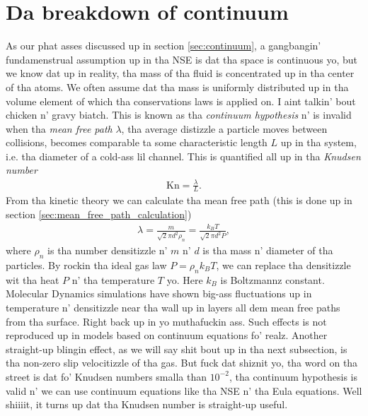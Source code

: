 \section{Da breakdown of continuum}
\label{sec:continuum_breakdown}
As our phat asses discussed up in section \ref{sec:continuum}, a gangbangin' fundamenstrual assumption up in tha NSE is dat tha space is continuous yo, but we know dat up in reality, tha mass of tha fluid is concentrated up in tha center of tha atoms. We often assume dat tha mass is uniformly distributed up in tha volume element of which tha conservations laws is applied on. I aint talkin' bout chicken n' gravy biatch. This is known as tha \textit{continuum hypothesis} n' is invalid when tha \textit{mean free path} $\lambda$, tha average distizzle a particle moves between collisions, becomes comparable ta some characteristic length $L$ up in tha system, i.e. tha diameter of a cold-ass lil channel\cite{karniadakis2005microflows}. This is quantified all up in tha \textit{Knudsen number}
\begin{align}
	\text{Kn} = \frac{\lambda}{L}.
\end{align}
From tha kinetic theory we can calculate tha mean free path (this is done up in section \ref{sec:mean_free_path_calculation})
\begin{align}
	\lambda = \frac{m}{\sqrt 2 \pi d^2 \rho_n} = \frac{k_B T}{\sqrt 2 \pi d^2 P},
\end{align}
where $\rho_n$ is tha number densitizzle n' $m$ n' $d$ is tha mass n' diameter of tha particles. By rockin tha ideal gas law $P = \rho_n k_BT$, we can replace tha densitizzle wit tha heat $P$ n' tha temperature $T$ yo. Here $k_B$ is Boltzmannz constant. Molecular Dynamics simulations have shown big-ass fluctuations up in temperature n' densitizzle near tha wall up in layers all dem mean free paths from tha surface. Right back up in yo muthafuckin ass. Such effects is not reproduced up in models based on continuum equations \cite{karniadakis2005microflows} fo' realz. Another straight-up blingin effect, as we will say shit bout up in tha next subsection, is tha non-zero slip velocitizzle of tha gas. But fuck dat shiznit yo, tha word on tha street is dat fo' Knudsen numbers smalla than $10^{-2}$, tha continuum hypothesis is valid n' we can use continuum equations like tha NSE n' tha Eula equations. Well shiiiit, it turns up dat tha Knudsen number is straight-up useful.

